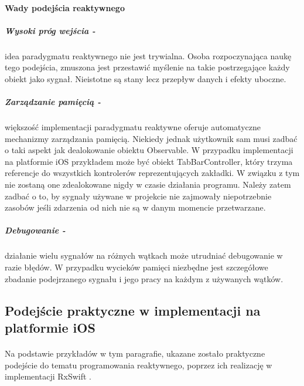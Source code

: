 \documentclass[12pt,oneside,a4paper]{report}
\begin{document}
\paragraph{Wady podejścia reaktywnego}
\subparagraph{Wysoki próg wejścia -}idea paradygmatu reaktywnego nie jest trywialna. Osoba rozpoczynająca naukę tego podejścia, zmuszona jest przestawić myślenie na takie postrzegające każdy obiekt jako sygnał. Nieistotne są stany lecz przepływ danych i efekty uboczne. 
\subparagraph{Zarządzanie pamięcią -}większość implementacji paradygmatu reaktywne oferuje automatyczne mechanizmy zarządzania pamięcią. Niekiedy jednak użytkownik sam musi zadbać o taki aspekt jak dealokowanie obiektu Observable. W przypadku implementacji na platformie iOS przykładem może być obiekt TabBarController, który trzyma referencje do wszystkich kontrolerów reprezentujących zakładki. W związku z tym nie zostaną one zdealokowane nigdy w czasie działania programu. Należy zatem zadbać o to, by sygnały używane w projekcie nie zajmowały niepotrzebnie zasobów jeśli zdarzenia od nich nie są w danym momencie przetwarzane.
\subparagraph{Debugowanie -}działanie wielu sygnałów na różnych wątkach może utrudniać debugowanie w razie błędów. W przypadku wycieków pamięci niezbędne jest szczegółowe zbadanie podejrzanego sygnału i jego pracy na każdym z używanych wątków.
\subsection{Podejście praktyczne w implementacji na platformie iOS}
\paragraph{}Na podstawie przykładów w tym paragrafie, ukazane zostało praktyczne podejście do tematu programowania reaktywnego, poprzez ich realizację w implementacji RxSwift \cite{examples}.
\end{document}
